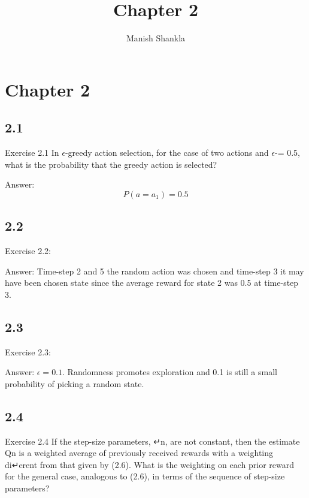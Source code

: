 \documentclass{article}
\begin{document}
\title{Chapter 2}
\author{Manish Shankla}

\maketitle


\section{Chapter 2}

\subsection{2.1}
Exercise 2.1 In $\epsilon$-greedy action selection, for the case of two actions and  $\epsilon$-= 0.5, what is the probability that the greedy action is selected?

Answer: 
\begin{equation}
P(a = a_1) = 0.5
\end{equation}

\subsection{2.2}

Exercise 2.2: 

Answer: Time-step 2 and 5 the random action was chosen and time-step 3 it may have been chosen state since the average reward for state 2 was 0.5 at time-step 3. 

\subsection{2.3}

Exercise 2.3: 

Answer: $\epsilon = 0.1$. Randomness promotes exploration and 0.1 is still a small probability of picking a random state. 



\subsection{2.4}
Exercise 2.4 If the step-size parameters, ↵n, are not constant, then the estimate Qn is a weighted average of previously received rewards with a weighting di↵erent from that given by (2.6). What is the weighting on each prior reward for the general case, analogous to (2.6), in terms of the sequence of step-size parameters?
\end{document}

